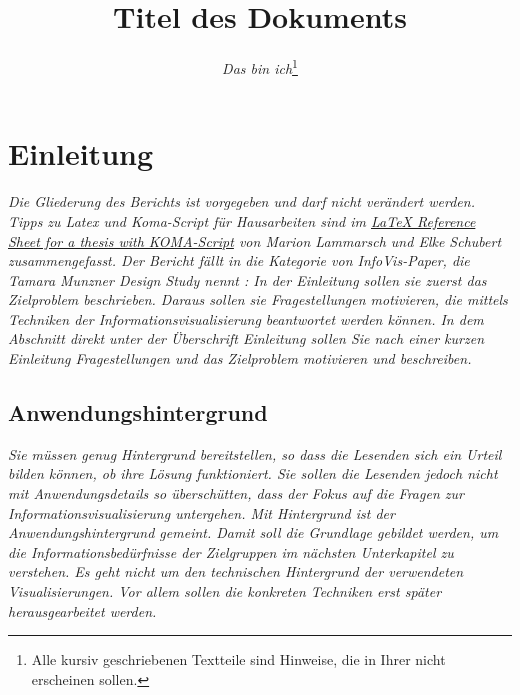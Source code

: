 \documentclass[usegeometry=true]{scrartcl}
\begin{document}
\subject{Projektbericht zum Modul Information Visualisierung Sommersemester 2026}
\title{Titel des Dokuments}
\author{\textit{Das bin ich}\footnote{Alle kursiv geschriebenen Textteile sind Hinweise, die in Ihrer nicht erscheinen sollen. }}%
\maketitle%

\section{Einleitung}
\textit{Die Gliederung des Berichts ist vorgegeben und darf nicht verändert werden.}
\textit{Tipps zu Latex und Koma-Script für Hausarbeiten sind im \href{http://mirrors.ctan.org/info/latex-refsheet/LaTeX_RefSheet.pdf}{LaTeX Reference Sheet for a thesis with KOMA-Script} von Marion Lammarsch und Elke Schubert zusammengefasst. 
 Der Bericht fällt in die Kategorie von InfoVis-Paper, die Tamara Munzner Design Study nennt \cite{Munzner2008}: In der Einleitung sollen sie zuerst das Zielproblem beschrieben. Daraus sollen sie Fragestellungen motivieren, die mittels Techniken der Informationsvisualisierung beantwortet werden können. In dem Abschnitt direkt unter der Überschrift Einleitung sollen Sie nach einer kurzen Einleitung Fragestellungen und das Zielproblem motivieren und beschreiben. 
}

\subsection{Anwendungshintergrund}
\textit{Sie müssen genug Hintergrund bereitstellen, so dass die Lesenden sich ein Urteil bilden können, ob ihre Lösung funktioniert. Sie sollen die Lesenden jedoch nicht mit Anwendungsdetails so überschütten, dass der Fokus auf die Fragen zur Informationsvisualisierung untergehen. 
Mit Hintergrund ist der Anwendungshintergrund gemeint. Damit soll die Grundlage gebildet werden, um die Informationsbedürfnisse der Zielgruppen im nächsten Unterkapitel zu verstehen. Es geht nicht um den technischen Hintergrund der verwendeten Visualisierungen. Vor allem sollen die konkreten Techniken erst später herausgearbeitet werden. 
}
\end{document}
